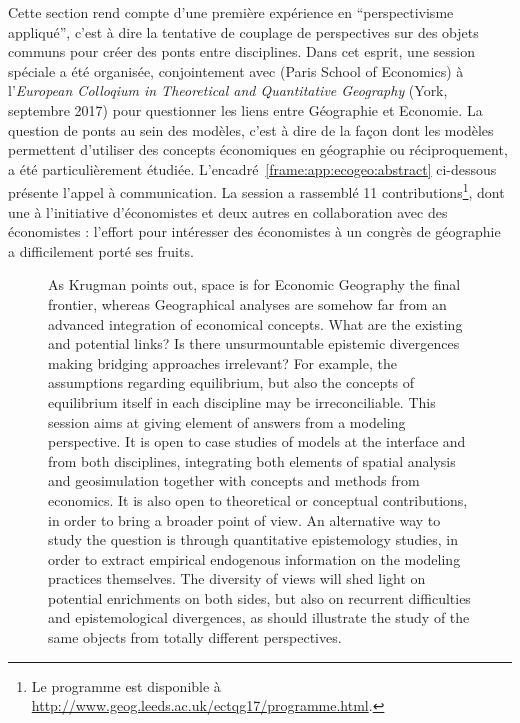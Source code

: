 Cette section rend compte d'une première expérience en ``perspectivisme appliqué'', c'est à dire la tentative de couplage de perspectives sur des objets communs pour créer des ponts entre disciplines. Dans cet esprit, une session spéciale a été organisée, conjointement avec  (Paris School of Economics) à l'\emph{European Colloqium in Theoretical and Quantitative Geography} (York, septembre 2017) pour questionner les liens entre Géographie et Economie. La question de ponts au sein des modèles, c'est à dire de la façon dont les modèles permettent d'utiliser des concepts économiques en géographie ou réciproquement, a été particulièrement étudiée. L'encadré~\ref{frame:app:ecogeo:abstract} ci-dessous présente l'appel à communication. La session a rassemblé 11 contributions\footnote{Le programme est disponible à \url{http://www.geog.leeds.ac.uk/ectqg17/programme.html}.}, dont une à l'initiative d'économistes et deux autres en collaboration avec des économistes : l'effort pour intéresser des économistes à un congrès de géographie a difficilement porté ses fruits.


\begin{figure}[h!]
\begin{mdframed}
	
	As Krugman points out, space is for Economic Geography the final frontier, whereas Geographical analyses are somehow far from an advanced integration of economical concepts. What are the existing and potential links? Is there unsurmountable epistemic divergences making bridging approaches irrelevant? For example, the assumptions regarding equilibrium, but also the concepts of equilibrium itself in each discipline may be irreconciliable. This session aims at giving element of answers from a modeling perspective. It is open to case studies of models at the interface and from both disciplines, integrating both elements of spatial analysis and geosimulation together with concepts and methods from economics. It is also open to theoretical or conceptual contributions, in order to bring a broader point of view. An alternative way to study the question is through quantitative epistemology studies, in order to extract empirical endogenous information on the modeling practices themselves. The diversity of views will shed light on potential enrichments on both sides, but also on recurrent difficulties and epistemological divergences, as should illustrate the study of the same objects from totally different perspectives.
	
	\medskip
	
\end{mdframed}
\end{figure}



